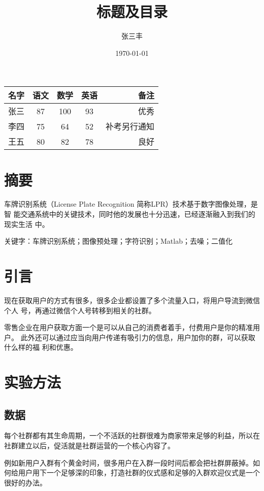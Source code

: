 \documentclass[a4paper,10pt]{article}
\title{标题及目录}
\author{张三丰}
\date{\today}
\begin{document}
\begin{CJK}{UTF8}{gbsn}
    \maketitle
    \tableofcontents
    \newpage

    \begin{tabular}{| l | c | c | c || r |}
    \hline
        名字 & 语文 & 数学 & 英语 & 备注\\
    \hline
        张三 & 87 & 100 & 93 & 优秀 \\
    \hline
        李四 & 75 & 64 & 52 & 补考另行通知\\
    \hline
    \hline
        王五 & 80 & 82 & 78 & 良好\\
    \hline
    \end{tabular}

    \section{摘要}
    车牌识别系统（License Plate Recognition 简称LPR）技术基于数字图像处理，是智
    能交通系统中的关键技术，同时他的发展也十分迅速，已经逐渐融入到我们的现实生活
    中。

    关键字：车牌识别系统；图像预处理；字符识别；Matlab；去噪；二值化

    \section{引言}
    现在获取用户的方式有很多，很多企业都设置了多个流量入口，将用户导流到微信个人
    号，再通过微信个人号转移到相关的社群。

    零售企业在用户获取方面一个是可以从自己的消费者着手，付费用户是你的精准用户。
    此外还可以通过应当向用户传递有吸引力的信息，用户加你的群，可以获取什么样的福
    利和优惠。

    \section{实验方法}

        \subsection{数据}
        每个社群都有其生命周期，一个不活跃的社群很难为商家带来足够的利益，所以在
        社群建立以后，促活就是社群运营的一个核心内容了。

        例如新用户入群有个黄金时间，很多用户在入群一段时间后都会把社群屏蔽掉。如
        何给用户用下一个足够深的印象，打造社群的仪式感和足够的入群欢迎仪式是一个
        很好的办法。


\end{CJK}
\end{document}
